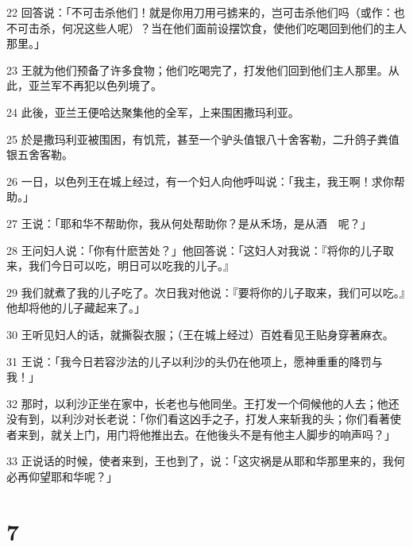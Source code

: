 \par 22 回答说：「不可击杀他们！就是你用刀用弓掳来的，岂可击杀他们吗（或作：也不可击杀，何况这些人呢）？当在他们面前设摆饮食，使他们吃喝回到他们的主人那里。」
\par 23 王就为他们预备了许多食物；他们吃喝完了，打发他们回到他们主人那里。从此，亚兰军不再犯以色列境了。
\par 24 此後，亚兰王便哈达聚集他的全军，上来围困撒玛利亚。
\par 25 於是撒玛利亚被围困，有饥荒，甚至一个驴头值银八十舍客勒，二升鸽子粪值银五舍客勒。
\par 26 一日，以色列王在城上经过，有一个妇人向他呼叫说：「我主，我王啊！求你帮助。」
\par 27 王说：「耶和华不帮助你，我从何处帮助你？是从禾场，是从酒　呢？」
\par 28 王问妇人说：「你有什麽苦处？」他回答说：「这妇人对我说：『将你的儿子取来，我们今日可以吃，明日可以吃我的儿子。』
\par 29 我们就煮了我的儿子吃了。次日我对他说：『要将你的儿子取来，我们可以吃。』他却将他的儿子藏起来了。」
\par 30 王听见妇人的话，就撕裂衣服；（王在城上经过）百姓看见王贴身穿著麻衣。
\par 31 王说：「我今日若容沙法的儿子以利沙的头仍在他项上，愿神重重的降罚与我！」
\par 32 那时，以利沙正坐在家中，长老也与他同坐。王打发一个伺候他的人去；他还没有到，以利沙对长老说：「你们看这凶手之子，打发人来斩我的头；你们看著使者来到，就关上门，用门将他推出去。在他後头不是有他主人脚步的响声吗？」
\par 33 正说话的时候，使者来到，王也到了，说：「这灾祸是从耶和华那里来的，我何必再仰望耶和华呢？」

\chapter{7}

